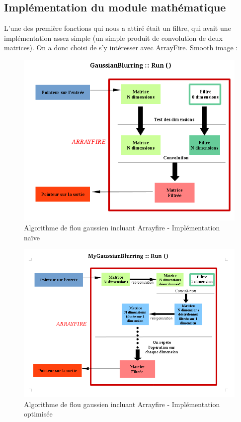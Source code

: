 \documentclass[10pt]{report}
\begin{document}
	\subsection{Implémentation du module mathématique}
L'une des première fonctions qui nous a attiré était un filtre, qui avait une implémentation assez simple (un simple produit de convolution de deux matrices). On a donc choisi de s'y intéresser avec ArrayFire.
Smooth image :
	\begin{figure}[h!]
		\begin{center}
			\includegraphics[width=12cm]{Reports/figures/gaussianblurring.png}
		\end{center}	
		\caption{Algorithme de flou gaussien incluant Arrayfire - Implémentation naïve}
		\label{Algorithme de flou gaussien incluant Arrayfire - Implémentation naïve}
	\end{figure}
	\begin{figure}[h!]
		\begin{center}
			\includegraphics[width=12cm]{Reports/figures/mygaussianblurring.png}
		\end{center}	
		\caption{Algorithme de flou gaussien incluant Arrayfire - Implémentation optimisée}
		\label{Algorithme de flou gaussien incluant Arrayfire - Implémentation optimisée}
	\end{figure}~\par
\end{document}
